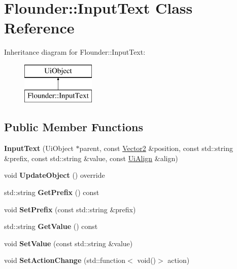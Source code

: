 \hypertarget{class_flounder_1_1_input_text}{}\section{Flounder\+:\+:Input\+Text Class Reference}
\label{class_flounder_1_1_input_text}
Inheritance diagram for Flounder\+:\+:Input\+Text\+:\begin{figure}[H]
\begin{center}
\leavevmode
\includegraphics[height=2.000000cm]{class_flounder_1_1_input_text}
\end{center}
\end{figure}
\subsection*{Public Member Functions}
\begin{DoxyCompactItemize}
\item 
\mbox{\label{class_flounder_1_1_input_text_a5850b1f5f46768670f3e61794a9632fc}} 
{\bfseries Input\+Text} (Ui\+Object $\ast$parent, const \hyperlink{class_flounder_1_1_vector2}{Vector2} \&position, const std\+::string \&prefix, const std\+::string \&value, const \hyperlink{namespace_flounder_a561db2012ae4152be62bcd882407d361}{Ui\+Align} \&align)
\item 
\mbox{\label{class_flounder_1_1_input_text_a049b9a5e45395f1cbb954450085463ea}} 
void {\bfseries Update\+Object} () override
\item 
\mbox{\label{class_flounder_1_1_input_text_aefe76fb46c69062278a6ddd95c86d63b}} 
std\+::string {\bfseries Get\+Prefix} () const
\item 
\mbox{\label{class_flounder_1_1_input_text_a7419bef7c3ccfab39d6910b0ec38f944}} 
void {\bfseries Set\+Prefix} (const std\+::string \&prefix)
\item 
\mbox{\label{class_flounder_1_1_input_text_a04459be07512e27f55168f3157dc86e5}} 
std\+::string {\bfseries Get\+Value} () const
\item 
\mbox{\label{class_flounder_1_1_input_text_a8270574191554615507490d830af1016}} 
void {\bfseries Set\+Value} (const std\+::string \&value)
\item 
\mbox{\label{class_flounder_1_1_input_text_ac494327aa2c41e1ebd089f086d70ef98}} 
void {\bfseries Set\+Action\+Change} (std\+::function$<$ void()$>$ action)
\end{DoxyCompactItemize}
